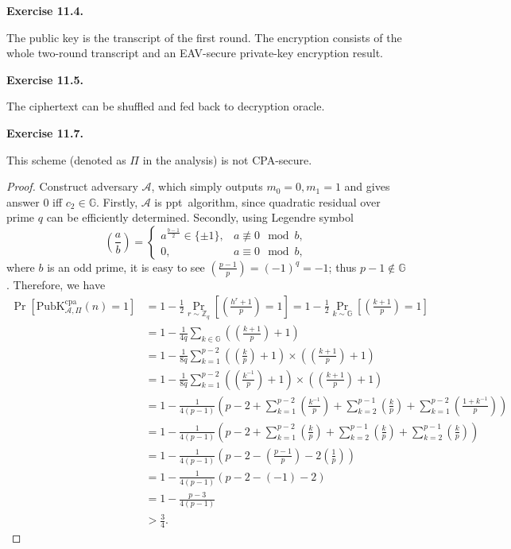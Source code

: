\documentclass[a4paper]{article}
\newtheorem*{proof}{Proof}
\newenvironment{exercise}[1]{
	\par
	\noindent\textbf{Exercise #1.}\quad
}{
	\par
	\bigskip
}
\newcommand{\pbra}[1]{\left( #1 \right)}
\newcommand{\sbra}[1]{\left[ #1 \right]}
\newcommand{\PubK}{\mathrm{PubK}}
\newcommand{\ppt}{{\sc ppt}~}
\newcommand{\cpa}{\mathrm{cpa}}
\newcommand{\Acal}{\mathcal{A}}
\newcommand{\Gset}{\mathbb{G}}
\newcommand{\Zset}{\mathbb{Z}}
\begin{document}
\begin{exercise}{11.4}
    The public key is the transcript of the first round. The encryption consists of the whole two-round transcript and an
    EAV-secure private-key encryption result. 
\end{exercise}

\begin{exercise}{11.5}
    The ciphertext can be shuffled and fed back to decryption oracle.
\end{exercise}

\begin{exercise}{11.7}
This scheme (denoted as $\Pi$ in the analysis) is not CPA-secure.
\begin{proof}
    Construct adversary $\Acal$, which simply outputs $m_0=0,m_1=1$ and 
    gives answer $0$ iff $c_2\in\Gset$.
    Firstly, $\Acal$ is \ppt algorithm, since quadratic residual over prime $q$ can be efficiently determined.
    Secondly, using Legendre symbol 
    $$
    \pbra{\frac{a}{b}}=\begin{cases}
        a^{\frac{b-1}{2}}\in\{\pm 1\}, & a\not\equiv 0\mod b,\\
        0, & a\equiv 0\mod b,
    \end{cases}
    $$
    where $b$ is an odd prime, it is easy to see $\pbra{\frac{p-1}{p}}=(-1)^q=-1$; thus $p-1\notin\Gset$.
    Therefore, we have
    \begin{align*}
        \Pr\sbra{\PubK_{\Acal,\Pi}^\cpa(n)=1}&=1-\frac12\Pr_{r\sim\Zset_q}\sbra{\pbra{\frac{h^r+1}{p}}=1}
            =1-\frac12\Pr_{k\sim\Gset}\sbra{\pbra{\frac{k+1}{p}}=1}\\
        &=1-\frac{1}{4q}\sum_{k\in\Gset}\pbra{\pbra{\frac{k+1}{p}}+1}\\
        &=1-\frac{1}{8q}\sum_{k=1}^{p-2}\pbra{\pbra{\frac{k}{p}}+1}\times\pbra{\pbra{\frac{k+1}{p}}+1}\\
        &=1-\frac{1}{8q}\sum_{k=1}^{p-2}\pbra{\pbra{\frac{k^{-1}}{p}}+1}\times\pbra{\pbra{\frac{k+1}{p}}+1}\\
        &=1-\frac{1}{4(p-1)}\pbra{p-2+\sum_{k=1}^{p-2}\pbra{\frac{k^{-1}}{p}}+
            \sum_{k=2}^{p-1}\pbra{\frac{k}{p}}+
            \sum_{k=1}^{p-2}\pbra{\frac{1+k^{-1}}{p}}}\\
        &=1-\frac{1}{4(p-1)}\pbra{p-2+\sum_{k=1}^{p-2}\pbra{\frac{k}{p}}+
            \sum_{k=2}^{p-1}\pbra{\frac{k}{p}}+
            \sum_{k=2}^{p-1}\pbra{\frac{k}{p}}}\\
        &=1-\frac{1}{4(p-1)}\pbra{p-2-\pbra{\frac{p-1}{p}}-2\pbra{\frac1p}}\\
        &=1-\frac{1}{4(p-1)}\pbra{p-2-(-1)-2}\\
        &=1-\frac{p-3}{4(p-1)}\\
        &>\frac34.
    \end{align*}
\end{proof}
\end{exercise}
\end{document}
